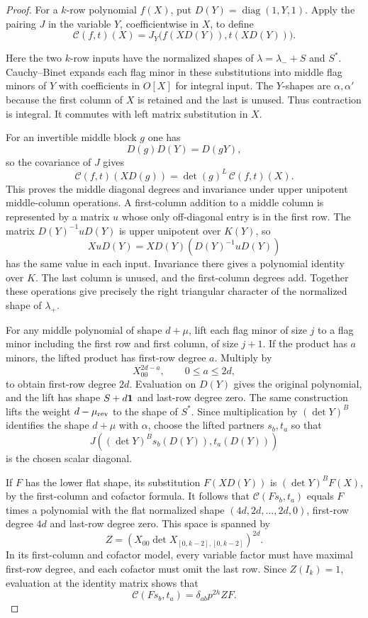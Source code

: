 \begin{proof}
For a \(k\)-row polynomial \(f(X)\), put
\(D(Y)=\operatorname{diag}(1,Y,1)\).
Apply the pairing \(J\) in the variable \(Y\), coefficientwise in \(X\), to define
\[
 \mathcal C(f,t)(X)=J_Y\bigl(f(XD(Y)),t(XD(Y))\bigr).
\]

Here the two \(k\)-row inputs have the normalized shapes
of \(\lambda=\lambda_-+S\) and \(S^*\).
Cauchy--Binet expands each flag minor in these substitutions
into middle flag minors of \(Y\) with coefficients in \(O[X]\)
for integral input. The \(Y\)-shapes are \(\alpha,\alpha'\)
because the first column of \(X\) is retained and the last is
unused. Thus contraction is integral. It commutes with left matrix substitution in \(X\).

For an invertible middle block \(g\) one has
\[
 D(g)D(Y)=D(gY),
\]
so the covariance of \(J\) gives
\[
 \mathcal C(f,t)(XD(g))=\det(g)^L\,\mathcal C(f,t)(X).
\]
This proves the middle diagonal degrees and invariance under
upper unipotent middle-column operations. A first-column
addition to a middle column is represented by a matrix \(u\)
whose only off-diagonal entry is in the first row. The matrix
\(D(Y)^{-1}uD(Y)\) is upper unipotent over \(K(Y)\), so
\[
 XuD(Y)=XD(Y)(D(Y)^{-1}uD(Y))
\]
has the same value in each input. Invariance there gives a
polynomial identity over \(K\). The last column is unused,
and the first-column degrees add. Together these operations
give precisely the right triangular character of the
normalized shape of \(\lambda_+\).

For any middle polynomial of shape \(d+\mu\), lift each
flag minor of size \(j\) to a flag minor including the first
row and first column, of size \(j+1\). If the product has \(a\) minors, the lifted product has first-row degree \(a\). Multiply by
\[
 X_{00}^{2d-a},\qquad 0\le a\le2d,
\]
to obtain first-row degree \(2d\).
Evaluation on \(D(Y)\) gives the original polynomial, and
the lift has shape \(S+d{\bf1}\) and last-row degree zero.
The same construction lifts the weight \(d-\mu_{\rm rev}\)
to the shape of \(S^*\). Since multiplication by
\((\det Y)^B\) identifies the shape \(d+\mu\) with \(\alpha\),
choose the lifted partners \(s_b,t_a\) so that
\[
 J((\det Y)^B s_b(D(Y)),t_a(D(Y)))
\]
is the chosen
scalar diagonal.

If \(F\) has the lower flat shape, its
substitution \(F(XD(Y))\) is \((\det Y)^B F(X)\),
by the first-column and cofactor formula.
It follows that \(\mathcal C(Fs_b,t_a)\) equals \(F\)
times a polynomial with the flat normalized shape
\((4d,2d,\ldots,2d,0)\), first-row degree \(4d\)
and last-row degree zero. This space is spanned by
\[
          Z=(X_{00}\det X_{[0,k-2],[0,k-2]})^{2d}.
\]
In its first-column and cofactor model, every variable factor
must have maximal first-row degree, and each cofactor must
omit the last row. Since \(Z(I_k)=1\), evaluation at the
identity matrix shows that
\[
 \mathcal C(Fs_b,t_a)= \delta_{ab}p^{2h}ZF.
\]


\end{proof}
